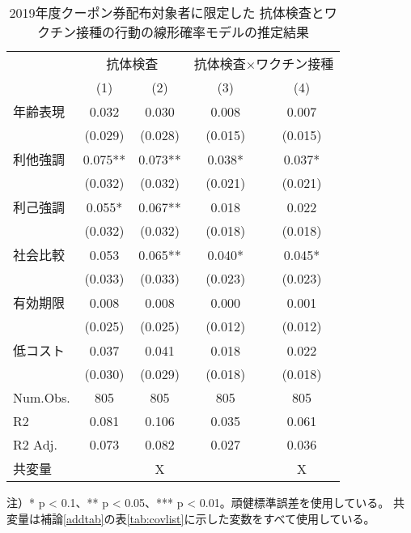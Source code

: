 \documentclass[
  11pt,
  a4paper,
]{article}
\begin{document}
\begin{table}

\caption{\label{tab:show-act-coupon1-reg}2019年度クーポン券配布対象者に限定した 抗体検査とワクチン接種の行動の線形確率モデルの推定結果}
\centering
\begin{threeparttable}
\begin{tabular}[t]{lcccc}
\toprule
\multicolumn{1}{c}{ } & \multicolumn{2}{c}{抗体検査} & \multicolumn{2}{c}{抗体検査×ワクチン接種} \\
\cmidrule(l{3pt}r{3pt}){2-3} \cmidrule(l{3pt}r{3pt}){4-5}
  & (1) & (2) & (3) & (4)\\
\midrule
年齢表現 & 0.032 & 0.030 & 0.008 & 0.007\\
 & (0.029) & (0.028) & (0.015) & (0.015)\\
利他強調 & 0.075** & 0.073** & 0.038* & 0.037*\\
 & (0.032) & (0.032) & (0.021) & (0.021)\\
利己強調 & 0.055* & 0.067** & 0.018 & 0.022\\
 & (0.032) & (0.032) & (0.018) & (0.018)\\
社会比較 & 0.053 & 0.065** & 0.040* & 0.045*\\
 & (0.033) & (0.033) & (0.023) & (0.023)\\
有効期限 & 0.008 & 0.008 & 0.000 & 0.001\\
 & (0.025) & (0.025) & (0.012) & (0.012)\\
低コスト & 0.037 & 0.041 & 0.018 & 0.022\\
 & (0.030) & (0.029) & (0.018) & (0.018)\\
\midrule
Num.Obs. & 805 & 805 & 805 & 805\\
R2 & 0.081 & 0.106 & 0.035 & 0.061\\
R2 Adj. & 0.073 & 0.082 & 0.027 & 0.036\\
共変量 &  & X &  & X\\
\bottomrule
\end{tabular}
\begin{tablenotes}
\item 注）* p < 0.1、** p < 0.05、*** p < 0.01。頑健標準誤差を使用している。 共変量は補論\ref{addtab}の表\ref{tab:covlist}に示した変数をすべて使用している。
\end{tablenotes}
\end{threeparttable}
\end{table}
\end{document}
